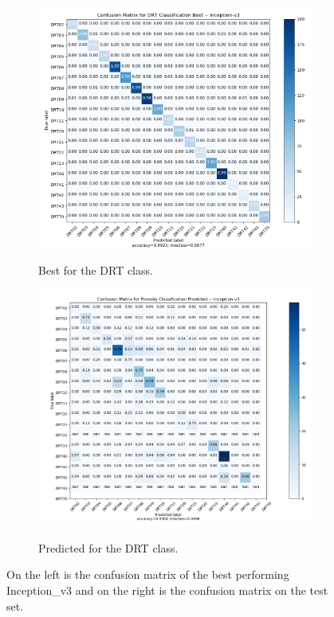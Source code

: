 \begin{figure}
{\begin{subfigure}[b]{.6\textwidth}
\centering
\includegraphics[width=.95\textwidth]{figures/04-go_drt_best.PNG}
\label{fig:gocm_drt}
\caption{Best for the DRT class.}
\end{subfigure}%
\begin{subfigure}[b]{.6\textwidth}
\centering
\includegraphics[width=.95\textwidth]{figures/04-go_drt_pred.PNG}
\label{fig:gocm_drt_pred}
\caption{Predicted for the DRT class.}
\end{subfigure}%
}
\caption[Confusion matrices of classes trained on Inception\_v3]{On the left is the confusion matrix of the best performing Inception\_v3 and on the right is the confusion matrix on the test set.}
\label{fig:gocm}
\end{figure}

